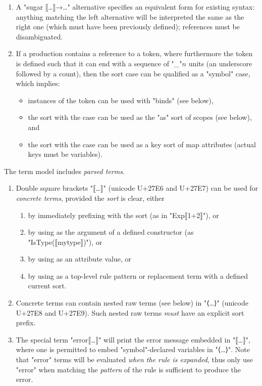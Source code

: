 \documentclass[11pt]{article} %
\begin{document}
\begin{manual}
\begin{enumerate}
  \item A "sugar ⟦…⟧→…" alternative specifies an equivalent form for existing syntax: anything
    matching the left alternative will be interpreted the same as the right one (which must have
    been previously defined); references must be disambiguated.

  \item If a production contains a reference to a token, where furthermore the token is defined such
    that it can end with a sequence of "_"$n$ units (an underscore followed by a count), then the
    sort case can be qualified as a "symbol" case, which implies:
    \begin{itemize}
    \item instances of the token can be used with "binds" (see below),
    \item the sort with the case can be used as the "as" sort of scopes (see below), and
    \item the sort with the case can be used as a key sort of map attributes (actual keys must be variables).
    \end{itemize}

  \end{enumerate}
\end{manual}

\begin{manual}\label{man:parsed}
  The term model includes \emph{parsed terms}.
  \begin{enumerate}

  \item Double square brackets "⟦…⟧" (unicode U+27E6 and U+27E7) can be used for \emph{concrete
      terms}, provided the \emph{sort} is clear, either
    \begin{enumerate}
    \item by immediately prefixing with the sort (as in "Exp⟦1+2⟧"), or
    \item by using as the argument of a defined constructor (as "IsType(⟦mytype⟧)"), or
    \item by using as an attribute value, or
    \item by using as a top-level rule pattern or replacement term with a defined current sort.
    \end{enumerate}

  \item Concrete terms can contain nested raw terms (see below) in "⟨…⟩" (unicode U+27E8 and
    U+27E9). Such nested raw terms \emph{must} have an explicit sort prefix.

  \item The special term "error⟦…⟧" will print the error message embedded in "⟦…⟧", where one is
    permitted to embed "symbol"-declared variables in "⟨…⟩". Note that "error" terms will be
    evaluated \emph{when the rule is expanded}, thus only use "error" when matching the
    \emph{pattern} of the rule is sufficient to produce the error.

  \end{enumerate}
\end{manual}
\end{document}
